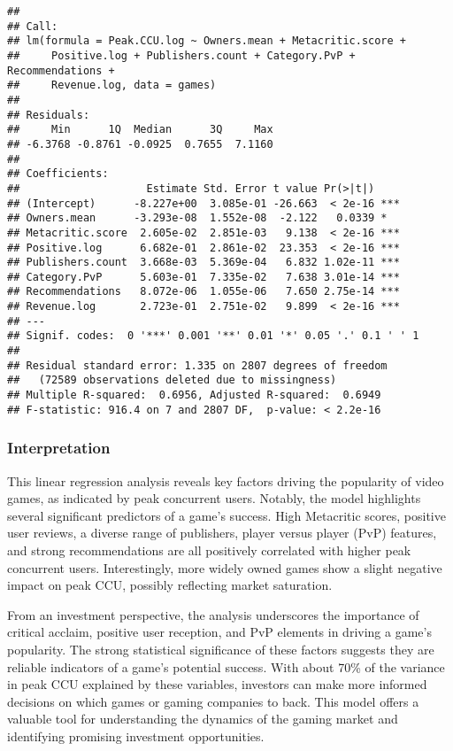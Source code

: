 \documentclass[
]{article}
\begin{document}
\begin{verbatim}
## 
## Call:
## lm(formula = Peak.CCU.log ~ Owners.mean + Metacritic.score + 
##     Positive.log + Publishers.count + Category.PvP + Recommendations + 
##     Revenue.log, data = games)
## 
## Residuals:
##     Min      1Q  Median      3Q     Max 
## -6.3768 -0.8761 -0.0925  0.7655  7.1160 
## 
## Coefficients:
##                    Estimate Std. Error t value Pr(>|t|)    
## (Intercept)      -8.227e+00  3.085e-01 -26.663  < 2e-16 ***
## Owners.mean      -3.293e-08  1.552e-08  -2.122   0.0339 *  
## Metacritic.score  2.605e-02  2.851e-03   9.138  < 2e-16 ***
## Positive.log      6.682e-01  2.861e-02  23.353  < 2e-16 ***
## Publishers.count  3.668e-03  5.369e-04   6.832 1.02e-11 ***
## Category.PvP      5.603e-01  7.335e-02   7.638 3.01e-14 ***
## Recommendations   8.072e-06  1.055e-06   7.650 2.75e-14 ***
## Revenue.log       2.723e-01  2.751e-02   9.899  < 2e-16 ***
## ---
## Signif. codes:  0 '***' 0.001 '**' 0.01 '*' 0.05 '.' 0.1 ' ' 1
## 
## Residual standard error: 1.335 on 2807 degrees of freedom
##   (72589 observations deleted due to missingness)
## Multiple R-squared:  0.6956, Adjusted R-squared:  0.6949 
## F-statistic: 916.4 on 7 and 2807 DF,  p-value: < 2.2e-16
\end{verbatim}

\hypertarget{interpretation}{%
\subsubsection{Interpretation}\label{interpretation}}

This linear regression analysis reveals key factors driving the
popularity of video games, as indicated by peak concurrent users.
Notably, the model highlights several significant predictors of a game's
success. High Metacritic scores, positive user reviews, a diverse range
of publishers, player versus player (PvP) features, and strong
recommendations are all positively correlated with higher peak
concurrent users. Interestingly, more widely owned games show a slight
negative impact on peak CCU, possibly reflecting market saturation.

From an investment perspective, the analysis underscores the importance
of critical acclaim, positive user reception, and PvP elements in
driving a game's popularity. The strong statistical significance of
these factors suggests they are reliable indicators of a game's
potential success. With about 70\% of the variance in peak CCU explained
by these variables, investors can make more informed decisions on which
games or gaming companies to back. This model offers a valuable tool for
understanding the dynamics of the gaming market and identifying
promising investment opportunities.
\end{document}
